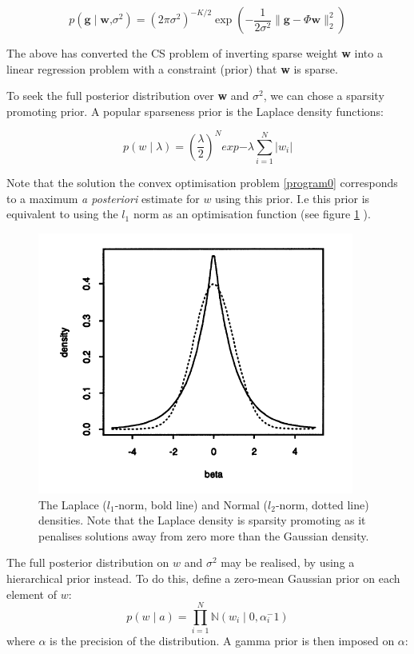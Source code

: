 \documentclass[conference]{IEEEtran}
\begin{document}
\begin{equation}
p \left( \textbf{g} \mid \textbf{w}\text{,} \sigma^2 \right) = (2 \pi \sigma^2)^{-K/2} \exp{\left(- \frac{1}{2 \sigma^2} \|\textbf{g} - \Phi	\textbf{w}\|_{2}^{2} \right)} 
\end{equation}

The above has converted the CS problem of inverting sparse weight \textbf{w} into a linear regression problem with a constraint (prior) that \textbf{w} is sparse. 

To seek the full posterior distribution over \textbf{w} and \( \sigma^2 \), we can chose a sparsity promoting prior. A popular sparseness prior is the Laplace density functions:

\begin{equation}
p\left(w\mid\lambda\right) = \left(\frac{\lambda}{2}\right)^N exp{-\lambda \sum_{i=1}^{N} |w_i|}
\end{equation}

Note that the solution the convex optimisation problem \ref{program0} corresponds to a maximum \textit{a posteriori} estimate for \(w\) using this prior. I.e this prior is equivalent to using the \(l_1\) norm as an optimisation function (see figure \ref{laplacenormal} \cite{Tibshirani1996}).

\begin{figure}[h]
\centering
\includegraphics[height = 7 cm]{LaplaceandNormalDensity.png}
\caption{The Laplace (\(l_1\)-norm, bold line) and Normal (\(l_2\)-norm, dotted line) densities. Note that the Laplace density is sparsity promoting as it penalises solutions away from zero more than the Gaussian density. \cite{Tibshirani1996}}
\label{laplacenormal}
\end{figure}

The full posterior distribution on \(w\) and \(\sigma^2\) may be realised, by using a hierarchical prior instead. To do this, define a zero-mean Gaussian prior on each element of \(w\):
%
\begin{equation}
p\left(w\mid a\right) = \prod_{i=1}^{N}\mathbb{N}\left(w_i\mid 0, \alpha_{i}^-1\right)
\end{equation}
%
where \(\alpha\) is the precision of the distribution. A gamma prior is then imposed on \(\alpha\):
\end{document}
